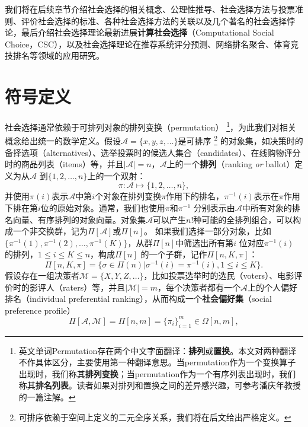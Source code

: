 我们将在后续章节介绍社会选择的相关概念、公理性推导、社会选择方法与投票准则、评价社会选择的标准、各种社会选择方法的关联以及几个著名的社会选择悖论，最后介绍社会选择理论最新进展\textbf{计算社会选择}（Computational Social Choice，CSC），以及社会选择理论在推荐系统评分预测、网络排名聚合、体育竞技排名等领域的应用研究。

\section{符号定义}
社会选择通常依赖于可排列对象的排列变换（permutation）
\footnote{英文单词Permutation存在两个中文字面翻译：\textbf{排列}或\textbf{置换}。本文对两种翻译不作具体区分，主要使用第一种翻译意思。当permutation作为一个变换算子出现时，我们称其\textbf{排列变换}；当permutation作为一个有序列表出现时，我们称其\textbf{排名列表}。读者如果对排列和置换之间的差异感兴趣，可参考潘庆年教授的一篇注解\cite{pan1998note}。}，为此我们对相关概念给出统一的数学定义。假设$\mathcal A = \{x,y,z,\ldots\}$是可排序
\footnote{可排序依赖于空间上定义的二元全序关系，我们将在后文给出严格定义。}
的对象集，如决策时的备择选项（alternatives）、选举投票时的候选人集合（candidates）、在线购物评分时的商品列表（items）等，并且$|\mathcal A|=n$，$\mathcal A$上的一个\textbf{排列}（ranking \textit{or} ballot）定义为从$\mathcal A$ 到$\{1,2,\ldots,n\}$上的一个双射：
\begin{equation}\label{eq:permutation}
    \pi: \mathcal A \mapsto \{1,2,\ldots,n\},
\end{equation}
并使用$\pi(i)$表示$\mathcal A$中第$i$个对象在排列变换$\pi$作用下的排名，$\pi^{-1}(i)$表示在$\pi$作用下排在第$i$位的原始对象。通常，我们也使用$\pi$和$\pi^{-1}$ 分别表示由$\mathcal A$中所有对象的排名向量、有序排列的对象向量。对象集$\mathcal A$可以产生$n!$种可能的全排列组合，可以构成一个非交换群，记为$\Pi[\mathcal A]$或$\Pi[n]$。 如果我们选择一部分对象，比如$\{\pi^{-1}(1), \pi^{-1}(2), \ldots, \pi^{-1}(K)\}$，从群$\Pi[n]$中筛选出所有第$i$ 位对应$\pi^{-1}(i)$ 的排列，$1\le i\le K \le n$，构成$\Pi[n]$ 的一个子群，记作$\Pi[n,K, \pi]$：
\begin{equation}\label{eq:subgroup}
    \Pi[n,K,\pi] = \big\{\sigma\in \Pi(n)|\sigma^{-1}(i) = \pi^{-1}(i), 1\le i \le K\big\}.
\end{equation}
假设存在一组决策者$\mathcal M=\{X,Y,Z,\ldots\}$，比如投票选举时的选民（voters）、电影评价时的影评人（raters）等，并且$|\mathcal M|=m$，每个决策者都有一个$\mathcal A$上的个人偏好排名（individual preferential ranking），从而构成一个\textbf{社会偏好集}（social preference profile）
\begin{equation}\label{eq:preferenceprofile}
    \Pi[\mathcal A,\mathcal M]=\Pi[n,m]=\{\pi_i\}_{i=1}^m\in  \Omega[n,m],
\end{equation}
